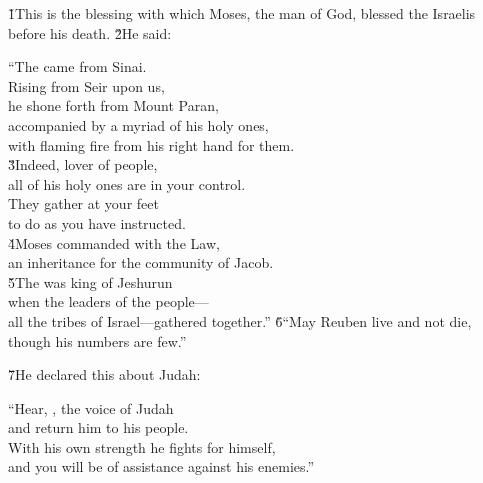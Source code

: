\v{1}This is the blessing with which Moses, the man of God, blessed the Israelis before his death. \v{2}He said:

\begin{poetry}
\poeml ``The  came from Sinai. \\
\poemll    Rising from Seir upon us, \\
\poeml he shone forth from Mount Paran, \\
\poemll    accompanied by a myriad of his holy ones, \\
\poemlll       with flaming fire from his right hand for them. \\
\poeml \v{3}Indeed, lover of people, \\
\poemll    all of his holy ones are in your control. \\
\poeml They gather at your feet \\
\poemll    to do as you have instructed. \\
\poeml \v{4}Moses commanded with the Law, \\
\poemll    an inheritance for the community of Jacob. \\
\poeml \v{5}The  was king of Jeshurun \\
\poemll    when the leaders of the people--- \\
\poemlll       all the tribes of Israel---gathered together.''
\poeml \v{6}``May Reuben live and not die, \\
\poemll    though his numbers are few.''
\end{poetry}

\v{7}He declared this about Judah:

\begin{poetry}
\poeml ``Hear, , the voice of Judah \\
\poemll    and return him to his people. \\
\poeml With his own strength he fights for himself, \\
\poemll    and you will be of assistance against his enemies.''
\end{poetry}

